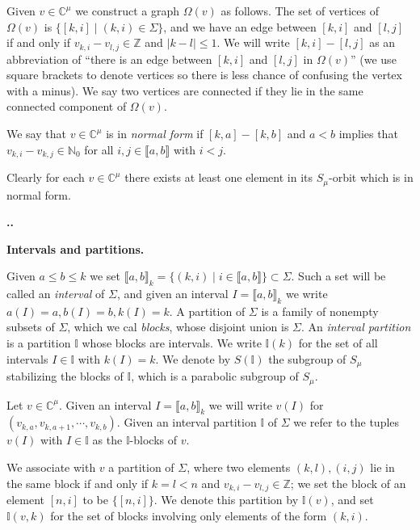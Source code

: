 \documentclass[11pt,fleqn]{amsart}
\renewcommand\thesection{\arabic{section}}
\newcounter{para}[section]
\renewcommand\thepara{\thesection.\arabic{para}}
\def\paragraph{%
 \noindent
 \refstepcounter{para}%
 \textbf{\thepara.}\hspace{1ex}%
}
\newcommand\about[1]{%
 {\bfseries#1.}%
}
\newcommand\NN{\mathbb N}
\newcommand\CC{\mathbb C}
\newcommand\ZZ{\mathbb Z}
\newcommand\II{\mathbb I}
\newcommand\interval[1]{\llbracket #1 \rrbracket}
\newcommand\abs[1]{|#1|}
\begin{document}
Given $v \in \CC^\mu$ we construct a graph $\Omega(v)$ as follows. The set of 
vertices of $\Omega(v)$ is $\{[k,i] \mid (k,i) \in \Sigma\}$, and we have an 
edge between $[k,i]$ and $[l,j]$ if and only if $v_{k,i} - v_{l,j} \in \ZZ$ 
and $\abs{k-l} \leq 1$. We will write $[k,i] - [l,j]$ as an abbreviation of 
``there is an edge between $[k,i]$ and $[l,j]$ in $\Omega(v)$'' (we use square 
brackets to denote vertices so there is less chance of confusing the vertex 
with a minus). We say two vertices are connected if they lie in the same
connected component of $\Omega(v)$.
\begin{Definition}
We say that $v \in \CC^\mu$ is in \emph{normal form} if $[k,a] - [k,b]$
and $a < b$ implies that $v_{k,i} - v_{k,j} \in \NN_0$ for all $i,j \in 
\interval{a,b}$ with $i < j$. 
\end{Definition}
Clearly for each $v \in \CC^\mu$ there exists at least one element in its 
$S_\mu$-orbit which is in normal form. 

\paragraph
\label{intervals}
\about{Intervals and partitions}
Given $a \leq b \leq k$ we set $\interval{a,b}_k = \{(k,i) \mid i \in 
\interval{a,b}\} \subset \Sigma$. Such a set will be called an \emph{interval}
of $\Sigma$, and given an interval $I = \interval{a,b}_k$ we write $a(I) = a,
b(I) = b, k(I) = k$. A partition of $\Sigma$ is a family of nonempty subsets 
of $\Sigma$, which we cal \emph{blocks}, whose disjoint union is $\Sigma$.
An \emph{interval partition} is a partition $\II$ whose blocks are intervals. 
We write $\II(k)$ for the set of all intervals $I \in \II$ with $k(I) = k$. 
We denote by $S(\II)$ the subgroup of $S_\mu$ stabilizing the blocks of $\II$,
which is a parabolic subgroup of $S_\mu$.

Let $v \in \CC^\mu$. Given an interval $I = \interval{a,b}_k$ we will write 
$v(I)$ for $(v_{k,a}, v_{k,a+1}, \cdots, v_{k,b})$. Given an interval 
partition $\II$ of $\Sigma$ we refer to the tuples $v(I)$ with $I \in \II$
as the $\II$-blocks of $v$.

We associate with $v$ a partition of $\Sigma$, where two elements $(k,l),(i,j)$
lie in the same block if and only if $k = l < n$ and $v_{k,i} - v_{l,j} \in 
\ZZ$; we set the block of an element $[n,i]$ to be $\{[n,i]\}$. We denote this 
partition by $\II(v)$, and set $\II(v,k)$ for the set of blocks involving only 
elements of the form $(k,i)$. 
\end{document}
